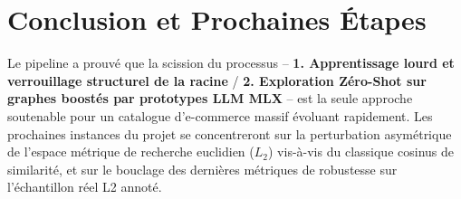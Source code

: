 \documentclass[11pt,a4paper]{article}
\begin{document}
\section{Conclusion et Prochaines Étapes}
Le pipeline a prouvé que la scission du processus -- \textbf{1. Apprentissage lourd et verrouillage structurel de la racine} / \textbf{2. Exploration Zéro-Shot sur graphes boostés par prototypes LLM MLX} -- est la seule approche soutenable pour un catalogue d'e-commerce massif évoluant rapidement.
Les prochaines instances du projet se concentreront sur la perturbation asymétrique de l'espace métrique de recherche euclidien ($L_2$) vis-à-vis du classique cosinus de similarité, et sur le bouclage des dernières métriques de robustesse sur l'échantillon réel L2 annoté.
\end{document}
